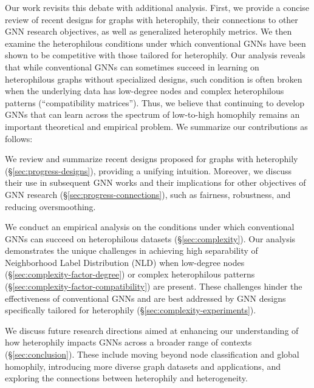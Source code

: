 Our work revisits this debate with additional analysis. First, we provide a concise review of recent designs for graphs with heterophily, their connections to other GNN research objectives, as well as generalized heterophily metrics. We then examine the heterophilous conditions under which conventional GNNs have been shown to be competitive with those tailored for heterophily. Our analysis reveals that while conventional GNNs can sometimes succeed in learning on heterophilous graphs without specialized designs,
such condition is often broken 
when the underlying data has low-degree nodes and complex heterophilous patterns (``compatibility matrices'').
Thus, we believe that continuing to develop GNNs that can learn across the spectrum of low-to-high homophily remains an important theoretical and empirical problem. We summarize our contributions as follows:
\begin{itemize*}
\item We review and summarize recent designs proposed for graphs with heterophily (\S\ref{sec:progress-designs}), providing a unifying intuition. Moreover, we discuss their use in subsequent GNN works and their implications for other objectives of GNN research (\S\ref{sec:progress-connections}), such as fairness, robustness, and reducing oversmoothing.
\item We conduct an empirical analysis on the conditions under which conventional GNNs can succeed on heterophilous datasets (\S\ref{sec:complexity}). Our analysis demonstrates the unique challenges in achieving high separability of Neighborhood Label Distribution (NLD) when low-degree nodes (\S\ref{sec:complexity-factor-degree}) or complex heterophilous patterns (\S\ref{sec:complexity-factor-compatibility}) are present. These challenges hinder the effectiveness of conventional GNNs and are best addressed by GNN designs specifically tailored for heterophily (\S\ref{sec:complexity-experiments}).
\item We discuss future research directions aimed at enhancing our understanding of how heterophily impacts GNNs across a broader range of contexts (\S\ref{sec:conclusion}). These include moving beyond node classification and global homophily, introducing more diverse graph datasets and applications, and exploring the connections between heterophily and heterogeneity. 
\end{itemize*}



